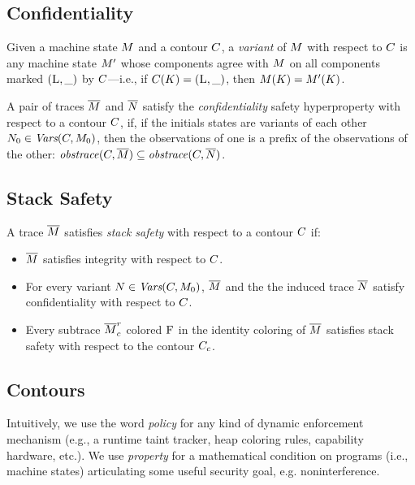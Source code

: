 \documentclass[conference]{IEEEtran}
\begin{document}
\subsection{Confidentiality}

Given a machine state $M$ and a contour $C$, a {\em
  variant} of $M$ with respect to $C$ is any machine state
$M'$ whose components agree with $M$ on all components marked
$(\textsc{L}, \_)$ by $C$---i.e., if $C(K) =
(\textsc{L}, \_)$, then $M(K) = M'(K)$.

A pair of traces $\overline{M}$ and $\overline{N}$ satisfy the {\em
  confidentiality} safety hyperproperty with respect to a contour
$C$, if, if the initials states are variants of each other $N_0
\in \textit{Vars}(C, M_0)$, then the observations of one is a prefix of the
observations of the other: $\mathit{obstrace}(C, \overline{M}) \subseteq
\mathit{obstrace}(C, \overline{N})$.

\subsection{Stack Safety}

A trace $\overline{M}$ satisfies {\em stack safety} with respect to a
contour $C$ if:
\begin{itemize}
\item $\overline{M}$ satisfies integrity with respect to $C$.
\item For every variant $N \in \textit{Vars}(C, M_0)$, $\overline{M}$
  and the the induced trace $\overline{N}$ satisfy confidentiality with
  respect to $C$.
\item Every subtrace $\overline{M}^r_c$ colored $\textsc{F}$ in the
  identity coloring of $\overline{M}$ satisfies stack safety with
  respect to the contour $C_c$.
\end{itemize}



\subsection{Contours}

\iftext
Intuitively, we use the word {\em policy} for any kind of dynamic
enforcement mechanism (e.g., a runtime taint tracker, heap coloring rules,
capability hardware, etc.).
We use {\em property} for a mathematical
condition on programs (i.e., machine states) articulating some useful
security goal, e.g. noninterference.
\fi
\end{document}
